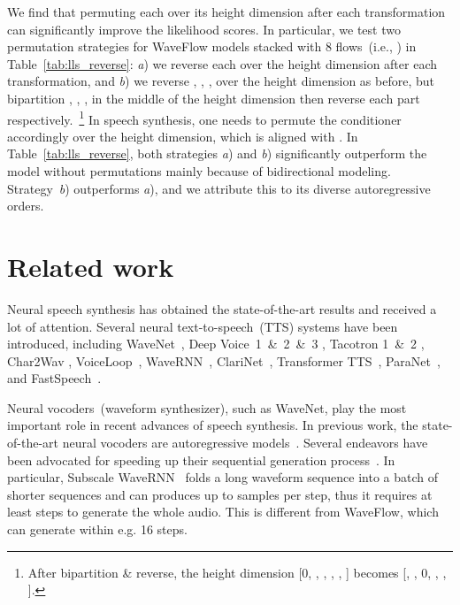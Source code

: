 \documentclass{article}
\begin{document}
We find that permuting each  over its height dimension after each transformation can significantly improve the likelihood scores.
In particular, we test two permutation strategies for WaveFlow models stacked with 8 flows~(i.e., ) in Table~\ref{tab:lls_reverse}: \emph{a}) we reverse each  over the height dimension after each transformation, and \emph{b}) we reverse , , ,  over the height dimension as before, but bipartition , , ,  in the middle of the height dimension then reverse each part respectively.~\footnote{After bipartition \& reverse, the height dimension [0, , , ,  , ] becomes [, , 0, , , ].}
In speech synthesis, one needs to permute the conditioner accordingly over the height dimension, which is aligned with .
In Table~\ref{tab:lls_reverse}, both strategies \emph{a}) and \emph{b}) significantly outperform the model without permutations mainly because of bidirectional modeling. Strategy~\emph{b}) outperforms \emph{a}), and we attribute this to its diverse autoregressive orders.

\vspace{-.3em}
\section{Related work}
\label{sec:related_work}
\vspace{-.1em}
Neural speech synthesis has obtained the state-of-the-art results and received a lot of attention. 
Several neural text-to-speech~(TTS) systems have been introduced, including WaveNet~\citep{oord2016wavenet}, Deep Voice~1~\&~2~\&~3 \citep{arik2017DV1, arik2017DV2, ping2017deep}, Tacotron 1~\&~2 \citep{wang2017tacotron, shen2018tacotron2}, Char2Wav \citep{sotelo2017char2wav}, VoiceLoop~\citep{taigman2018voiceloop}, WaveRNN~\citep{kalchbrenner2018efficient}, ClariNet~\citep{ping2018clarinet}, Transformer TTS~\citep{li2019neural}, ParaNet~\citep{peng2019parallel}, and FastSpeech~\citep{ren2019fastspeech}.

Neural vocoders~(waveform synthesizer), such as WaveNet,  play the most important role in recent advances of speech synthesis. 
In previous work, the state-of-the-art neural vocoders are autoregressive models~\citep{oord2016wavenet, mehri2016samplernn, kalchbrenner2018efficient}.
Several endeavors have been advocated for speeding up their sequential generation process~\citep{arik2017DV1, kalchbrenner2018efficient}.
In particular, Subscale WaveRNN~\citep{kalchbrenner2018efficient} folds a long waveform sequence  into a batch of shorter sequences and can produces up to  samples per step, thus it requires at least  steps to generate the whole audio.
This is different from WaveFlow, which can generate  within e.g. 16 steps.
\end{document}
